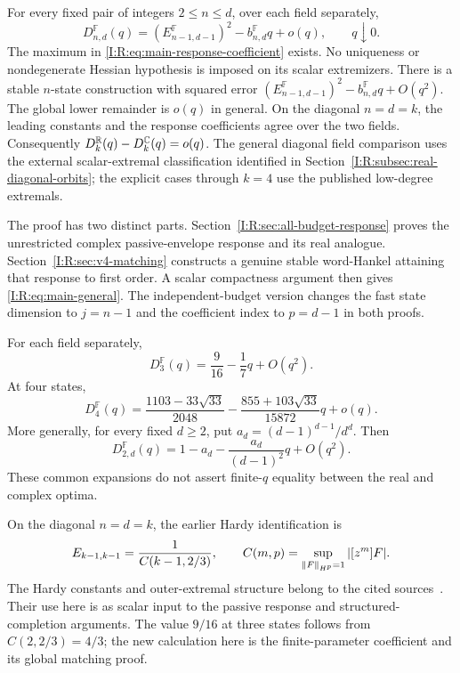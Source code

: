 \begin{theorem}
\label{I:R:thm:main-general}
For every fixed pair of integers $2\le n\le d$, over each field separately,
\begin{equation}
 \boxed{\displaystyle
 D_{n,d}^{\mathbb F}(q)=
 (E_{n-1,d-1}^{\mathbb F})^2-b_{n,d}^{\mathbb F}q+o(q),
 \qquad q\downarrow0.}
 \label{I:R:eq:main-general}
\end{equation}
The maximum in \eqref{I:R:eq:main-response-coefficient} exists. No uniqueness
or nondegenerate Hessian hypothesis is imposed on its scalar extremizers.
There is a stable $n$-state construction with squared error
$(E_{n-1,d-1}^{\mathbb F})^2-b_{n,d}^{\mathbb F}q+O(q^2)$.
The global lower remainder is $o(q)$ in general.
On the diagonal $n=d=k$, the leading constants and the response
coefficients agree over the two fields. Consequently
$D_k^{\mathbb R}(q)-D_k^{\mathbb C}(q)=o(q)$.
The general diagonal field comparison uses the external scalar-extremal
classification identified in Section~\ref{I:R:subsec:real-diagonal-orbits};
the explicit cases through $k=4$ use the published low-degree extremals.
\end{theorem}

The proof has two distinct parts. Section~\ref{I:R:sec:all-budget-response}
proves the unrestricted complex passive-envelope response and its
real analogue. Section~\ref{I:R:sec:v4-matching} constructs a genuine stable
word-Hankel attaining that response to first order. A scalar compactness
argument then gives \eqref{I:R:eq:main-general}. The independent-budget
version changes the fast state dimension to $j=n-1$ and the coefficient
index to $p=d-1$ in both proofs.

\begin{corollary}
\label{I:R:cor:main-explicit}
For each field separately,
\[
 \boxed{D_3^{\mathbb F}(q)=\frac9{16}-\frac17q+O(q^2).}
\]
At four states,
\[
 \boxed{D_4^{\mathbb F}(q)=
 \frac{1103-33\sqrt{33}}{2048}
 -\frac{855+103\sqrt{33}}{15872}q+o(q).}
\]
More generally, for every fixed $d\ge2$, put
$a_d=(d-1)^{d-1}/d^d$. Then
\[
 \boxed{D_{2,d}^{\mathbb F}(q)=
       1-a_d-\frac{a_d}{(d-1)^2}q+O(q^2).}
\]
These common expansions do not assert finite-$q$ equality between the
real and complex optima.
\end{corollary}

On the diagonal $n=d=k$, the earlier Hardy identification is
\[
 E_{k-1,k-1}=\frac1{C(k-1,2/3)},\qquad
 C(m,p)=\sup_{\left\lVert F\right\rVert_{H^p}=1}|[z^m]F|.
\]
The Hardy constants and outer-extremal structure belong to the cited
sources~\cite{brevig2020,outer2026}. Their use here is as scalar input to the
passive response and structured-completion arguments. The value $9/16$
at three states follows from $C(2,2/3)=4/3$; the new calculation here is the finite-parameter coefficient and its global matching proof.

